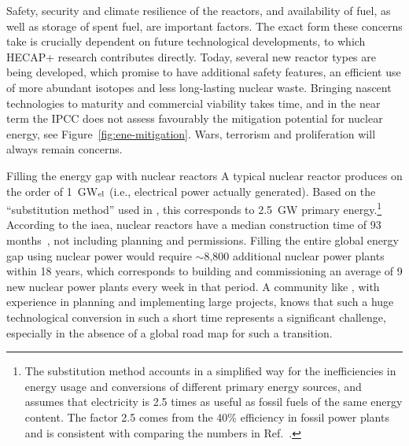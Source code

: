 \documentclass[../SustainableHEP.tex]{subfiles}
\begin{document}
Safety, security and climate resilience of the reactors, and availability of fuel, as well as storage of spent fuel, are important factors.
The exact form these concerns take is crucially dependent on future technological developments, to which HECAP+ research contributes directly. Today, several new reactor types are being developed, which promise to have additional safety features, an efficient use of more abundant isotopes and less long-lasting nuclear waste.  Bringing nascent technologies to maturity and commercial viability takes time, and in the near term the IPCC does not assess favourably the mitigation potential for nuclear energy, see Figure~\ref{fig:ene-mitigation}.  Wars, terrorism and proliferation will always remain concerns.


\begin{casestudy}{Filling the energy gap with nuclear reactors\label{case:nuclear}}%
    A typical nuclear reactor produces on the order of 1~GW$_{\rm el}$ (i.e., electrical power actually generated).
    Based on the ``substitution method'' used in , this corresponds to 2.5~GW primary energy.\footnote{The substitution method accounts in a simplified way for the inefficiencies in energy usage and conversions of different primary energy sources, and assumes that electricity is 2.5 times as useful as fossil fuels of the same energy content.  The factor 2.5 comes from the 40\% efficiency in fossil power plants~\cite{BP} and is consistent with comparing the numbers in Ref.~\cite{OWDprod}.} 
    According to the \acrshort{iaea}, nuclear reactors have a median construction time of 93 months~\cite{IAEANuclear}, not including planning and permissions. 
    Filling the entire global energy gap using nuclear power would require $\sim$8,800 additional nuclear power plants within 18 years, which corresponds to building and commissioning an average of 9 new nuclear power plants every week in that period. 
    A community like \ACR, with experience in planning and implementing large projects, knows that such a huge technological conversion in such a short time represents a significant challenge, especially in the absence of a global road map for such a transition.
\end{casestudy}

\end{document}
